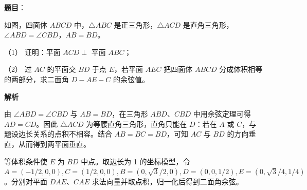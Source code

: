 \begin{answer}

\textbf{题目}：

如图，四面体 \(ABCD\) 中，\(\triangle ABC\) 是正三角形，\(\triangle ACD\) 是直角三角形，\(\angle ABD=\angle CBD\)，\(AB=BD\)。
\nopagebreak[4]
\begin{center}\end{center}
\nopagebreak[4]
   （1） 证明：平面 \(ACD\perp\) 平面 \(ABC\)；

   （2） 过 \(AC\) 的平面交 \(BD\) 于点 \(E\)，若平面 \(AEC\) 把四面体 \(ABCD\) 分成体积相等的两部分，求二面角 \(D-AE-C\) 的余弦值。

\textbf{解析}


由 \(\angle ABD=\angle CBD\) 与 \(AB=BD\)，在三角形 \(ABD\)、\(CBD\) 中用余弦定理可得 \(AD=CD\)。因此 \(\triangle ACD\) 为等腰直角三角形，直角只能在 \(D\)：若在 \(A\) 或 \(C\)，与题设边长关系的点积不相容。结合 \(AB=BC=BD\)，可知 \(AC\) 与 \(BD\) 的方向垂直，从而得到两平面垂直。


等体积条件使 \(E\) 为 \(BD\) 中点。取边长为 1 的坐标模型，令 \(A=(-1/2,0,0),C=(1/2,0,0),B=(0,\sqrt3/2,0),D=(0,0,1/2),E=(0,\sqrt3/4,1/4)\)。分别对平面 \(DAE\)、\(CAE\) 求法向量并取点积，归一化后得到二面角余弦。



\end{answer}
